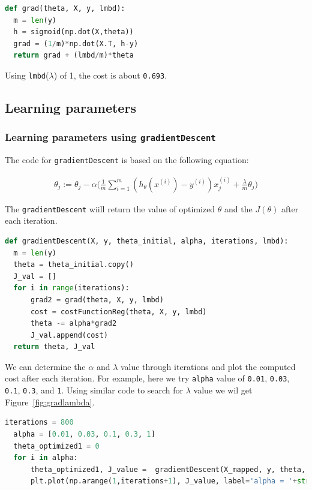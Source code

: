 \documentclass[12pt]{article}
\begin{document}
\begin{lstlisting}[language=Python]
  def grad(theta, X, y, lmbd):
  m = len(y)
  h = sigmoid(np.dot(X,theta))
  grad = (1/m)*np.dot(X.T, h-y)
  return grad + (lmbd/m)*theta
\end{lstlisting}

Using \texttt{lmbd}($\lambda$) of 1, the cost is about \texttt{0.693}.

\subsection{Learning parameters}

\subsubsection{Learning parameters using \texttt{gradientDescent}} 

The code for \texttt{gradientDescent} is based on the following equation:

\begin{align}
  \theta_j := \theta_j - \alpha \bigg(\frac{1}{m}\sum_{i=1}^m{(h_\theta(x^{(i)})-y^{(i)}) x_j^{(i)}} + \frac{\lambda}{m}\theta_j\bigg)
  \end{align}

The \texttt{gradientDescent} wiill return the value of optimized $\theta$ and the $J(\theta)$ after each iteration. 

\begin{lstlisting}[language=Python]
  def gradientDescent(X, y, theta_initial, alpha, iterations, lmbd):
  m = len(y)
  theta = theta_initial.copy()
  J_val = []
  for i in range(iterations):
      grad2 = grad(theta, X, y, lmbd)
      cost = costFunctionReg(theta, X, y, lmbd)
      theta -= alpha*grad2
      J_val.append(cost)
  return theta, J_val
\end{lstlisting}

We can determine the $\alpha$ and $\lambda$ value through iterations and plot the computed cost after each iteration. For example, here we try \texttt{alpha} value of \texttt{0.01}, \texttt{0.03}, \texttt{0.1}, \texttt{0.3}, and \texttt{1}. Using similar code to search for $\lambda$ value we wil get Figure~\ref{fig:gradlambda}. 

\begin{lstlisting}[language=Python]
  iterations = 800
  alpha = [0.01, 0.03, 0.1, 0.3, 1]
  theta_optimized1 = 0
  for i in alpha:
      theta_optimized1, J_value =  gradientDescent(X_mapped, y, theta, alpha=i, iterations=iterations, lmbd=1)
      plt.plot(np.arange(1,iterations+1), J_value, label='alpha = '+str(i))
\end{lstlisting}
\end{document}
